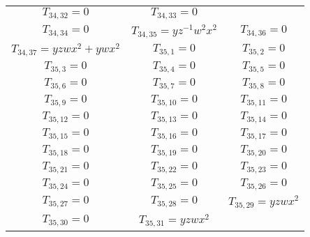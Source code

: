 \begin{longtable}{|c|c|c|}
$T_{34,32}= 0$&

$T_{34,33}= 0$\\

$T_{34,34}= 0$&

$T_{34,35}= yz^{-1}w^2x^2$&

$T_{34,36}= 0$\\

$T_{34,37}= yzwx^2+ywx^2$&

$T_{35,1}= 0$&

$T_{35,2}= 0$\\

$T_{35,3}= 0$&

$T_{35,4}= 0$&

$T_{35,5}= 0$\\

$T_{35,6}= 0$&

$T_{35,7}= 0$&

$T_{35,8}= 0$\\

$T_{35,9}= 0$&

$T_{35,10}= 0$&

$T_{35,11}= 0$\\

$T_{35,12}= 0$&

$T_{35,13}= 0$&

$T_{35,14}= 0$\\

$T_{35,15}= 0$&

$T_{35,16}= 0$&

$T_{35,17}= 0$\\

$T_{35,18}= 0$&

$T_{35,19}= 0$&

$T_{35,20}= 0$\\

$T_{35,21}= 0$&

$T_{35,22}= 0$&

$T_{35,23}= 0$\\

$T_{35,24}= 0$&

$T_{35,25}= 0$&

$T_{35,26}= 0$\\

$T_{35,27}= 0$&

$T_{35,28}= 0$&

$T_{35,29}= yzwx^2$\\

$T_{35,30}= 0$&

$T_{35,31}= yzwx^2$&


\end{longtable}
